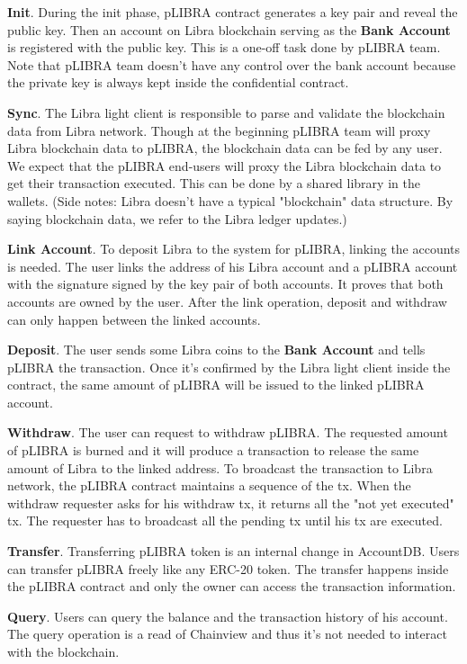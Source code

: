 \begin{icompact}
    \item \textbf{Init}. During the init phase, pLIBRA contract generates a key pair and reveal the public key. Then an account on Libra blockchain serving as the \textbf{Bank Account} is registered with the public key. This is a one-off task done by pLIBRA team. Note that pLIBRA team doesn't have any control over the bank account because the private key is always kept inside the confidential contract.
    \item \textbf{Sync}. The Libra light client is responsible to parse and validate the blockchain data from Libra network. Though at the beginning pLIBRA team will proxy Libra blockchain data to pLIBRA, the blockchain data can be fed by any user. We expect that the pLIBRA end-users will proxy the Libra blockchain data to get their transaction executed. This can be done by a shared library in the wallets. (Side notes: Libra doesn't have a typical "blockchain" data structure. By saying blockchain data, we refer to the Libra ledger updates.)
    \item \textbf{Link Account}. To deposit Libra to the system for pLIBRA, linking the accounts is needed. The user links the address of his Libra account and a pLIBRA account with the signature signed by the key pair of both accounts. It proves that both accounts are owned by the user. After the link operation, deposit and withdraw can only happen between the linked accounts.
    \item \textbf{Deposit}. The user sends some Libra coins to the \textbf{Bank Account} and tells pLIBRA the transaction. Once it's confirmed by the Libra light client inside the contract, the same amount of pLIBRA will be issued to the linked pLIBRA account.
    \item \textbf{Withdraw}. The user can request to withdraw pLIBRA. The requested amount of pLIBRA is burned and it will produce a transaction to release the same amount of Libra to the linked address. To broadcast the transaction to Libra network, the pLIBRA contract maintains a sequence of the tx. When the withdraw requester asks for his withdraw tx, it returns all the "not yet executed" tx. The requester has to broadcast all the pending tx until his tx are executed.
    \item \textbf{Transfer}. Transferring pLIBRA token is an internal change in AccountDB. Users can transfer pLIBRA freely like any ERC-20 token. The transfer happens inside the pLIBRA contract and only the owner can access the transaction information.
    \item \textbf{Query}. Users can query the balance and the transaction history of his account. The query operation is a read of Chainview and thus it's not needed to interact with the blockchain.
\end{icompact}
